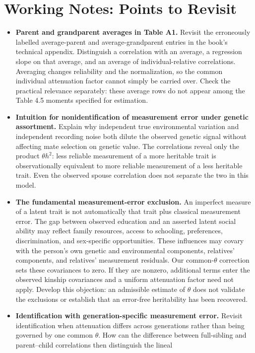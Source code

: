 \section*{Working Notes: Points to Revisit}
\begin{itemize}
\item \textbf{Parent and grandparent averages in Table A1.}
Revisit the erroneously labelled average-parent and average-grandparent
entries in the book's technical appendix. Distinguish a correlation with
an average, a regression slope on that average, and an average of
individual-relative correlations. Averaging changes reliability and the
normalization, so the common individual attenuation factor cannot simply
be carried over. Check the practical relevance separately: these average
rows do not appear among the Table 4.5 moments specified for estimation.
\item \textbf{Intuition for nonidentification of measurement error under
genetic assortment.} Explain why independent true environmental variation
and independent recording noise both dilute the observed genetic signal
without affecting mate selection on genetic value. The correlations reveal
only the product $\theta h^2$: less reliable measurement of a more
heritable trait is observationally equivalent to more reliable measurement
of a less heritable trait. Even the observed spouse correlation does not
separate the two in this model.
\item \textbf{The fundamental measurement-error exclusion.}
An imperfect measure of a latent trait is not automatically that trait
plus classical measurement error. The gap between observed education and
an asserted latent social ability may reflect family resources, access
to schooling, preferences, discrimination, and sex-specific opportunities.
These influences may covary with the person's own genetic and environmental
components, relatives' components, and relatives' measurement residuals.
Our common-$\theta$ correction sets these covariances to zero. If they
are nonzero, additional terms enter the observed kinship covariances and
a uniform attenuation factor need not apply. Develop this objection:
an admissible estimate of $\theta$ does not validate the exclusions or
establish that an error-free heritability has been recovered.
\item \textbf{Identification with generation-specific measurement error.}
Revisit identification when attenuation differs across generations rather
than being governed by one common $\theta$. How can the difference between
full-sibling and parent--child correlations then distinguish the lineal

\end{itemize}
